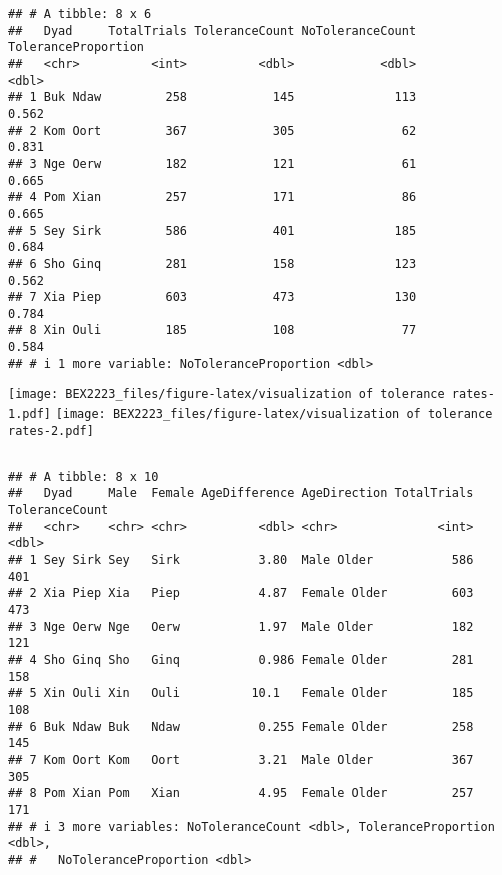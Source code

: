\documentclass[
]{article}
\begin{document}
\begin{verbatim}
## # A tibble: 8 x 6
##   Dyad     TotalTrials ToleranceCount NoToleranceCount ToleranceProportion
##   <chr>          <int>          <dbl>            <dbl>               <dbl>
## 1 Buk Ndaw         258            145              113               0.562
## 2 Kom Oort         367            305               62               0.831
## 3 Nge Oerw         182            121               61               0.665
## 4 Pom Xian         257            171               86               0.665
## 5 Sey Sirk         586            401              185               0.684
## 6 Sho Ginq         281            158              123               0.562
## 7 Xia Piep         603            473              130               0.784
## 8 Xin Ouli         185            108               77               0.584
## # i 1 more variable: NoToleranceProportion <dbl>
\end{verbatim}

\texttt{[image: BEX2223\_files/figure-latex/visualization of tolerance rates-1.pdf]}
\texttt{[image: BEX2223\_files/figure-latex/visualization of tolerance rates-2.pdf]}

\hypertarget{section-1}{%
\subsection{}\label{section-1}}

\begin{verbatim}
## # A tibble: 8 x 10
##   Dyad     Male  Female AgeDifference AgeDirection TotalTrials ToleranceCount
##   <chr>    <chr> <chr>          <dbl> <chr>              <int>          <dbl>
## 1 Sey Sirk Sey   Sirk           3.80  Male Older           586            401
## 2 Xia Piep Xia   Piep           4.87  Female Older         603            473
## 3 Nge Oerw Nge   Oerw           1.97  Male Older           182            121
## 4 Sho Ginq Sho   Ginq           0.986 Female Older         281            158
## 5 Xin Ouli Xin   Ouli          10.1   Female Older         185            108
## 6 Buk Ndaw Buk   Ndaw           0.255 Female Older         258            145
## 7 Kom Oort Kom   Oort           3.21  Male Older           367            305
## 8 Pom Xian Pom   Xian           4.95  Female Older         257            171
## # i 3 more variables: NoToleranceCount <dbl>, ToleranceProportion <dbl>,
## #   NoToleranceProportion <dbl>
\end{verbatim}
\end{document}
